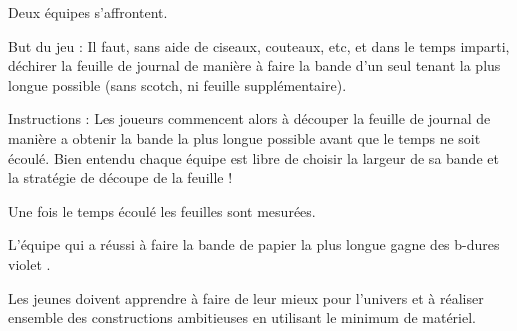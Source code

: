 \documentclass{grand-jeu}
\begin{document}
\begin{liste-materiel}
\end{liste-materiel}

\begin{regles}
Deux équipes s’affrontent.

But du jeu : Il faut, sans aide de ciseaux, couteaux, etc, et dans le temps imparti, déchirer la feuille de journal de manière à faire la bande d’un seul tenant la plus longue possible (sans scotch, ni feuille supplémentaire).

Instructions : Les joueurs commencent alors à découper la feuille de journal de manière a obtenir la bande la plus longue possible avant que le temps ne soit écoulé. Bien entendu chaque équipe est libre de choisir la largeur de sa bande et la stratégie de découpe de la feuille !

Une fois le temps écoulé les feuilles sont mesurées. 

L'équipe qui a réussi à faire la bande de papier la plus longue gagne des b-dures violet .
\end{regles}

\begin{imaginaire}
Les jeunes doivent apprendre à faire de leur mieux pour l'univers et à réaliser ensemble des constructions ambitieuses en utilisant le minimum de matériel.
\end{imaginaire}

\begin{moments-stop}
\end{moments-stop}
\end{document}
